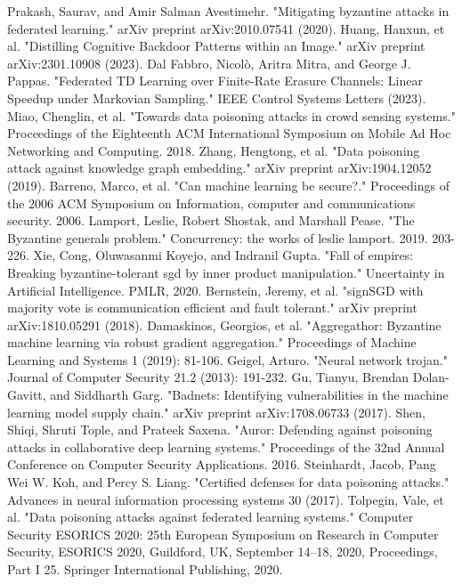 \documentclass[conference]{IEEEtran}
\begin{document}
\begin{thebibliography}{00}
     Prakash, Saurav, and Amir Salman Avestimehr. "Mitigating byzantine attacks in federated learning." arXiv preprint arXiv:2010.07541 (2020).
     Huang, Hanxun, et al. "Distilling Cognitive Backdoor Patterns within an Image." arXiv preprint arXiv:2301.10908 (2023).
     Dal Fabbro, Nicolò, Aritra Mitra, and George J. Pappas. "Federated TD Learning over Finite-Rate Erasure Channels: Linear Speedup under Markovian Sampling." IEEE Control Systems Letters (2023).
     Miao, Chenglin, et al. "Towards data poisoning attacks in crowd sensing systems." Proceedings of the Eighteenth ACM International Symposium on Mobile Ad Hoc Networking and Computing. 2018.
     Zhang, Hengtong, et al. "Data poisoning attack against knowledge graph embedding." arXiv preprint arXiv:1904.12052 (2019).
     Barreno, Marco, et al. "Can machine learning be secure?." Proceedings of the 2006 ACM Symposium on Information, computer and communications security. 2006.
     Lamport, Leslie, Robert Shostak, and Marshall Pease. "The Byzantine generals problem." Concurrency: the works of leslie lamport. 2019. 203-226.
     Xie, Cong, Oluwasanmi Koyejo, and Indranil Gupta. "Fall of empires: Breaking byzantine-tolerant sgd by inner product manipulation." Uncertainty in Artificial Intelligence. PMLR, 2020.
     Bernstein, Jeremy, et al. "signSGD with majority vote is communication efficient and fault tolerant." arXiv preprint arXiv:1810.05291 (2018).
     Damaskinos, Georgios, et al. "Aggregathor: Byzantine machine learning via robust gradient aggregation." Proceedings of Machine Learning and Systems 1 (2019): 81-106.
     Geigel, Arturo. "Neural network trojan." Journal of Computer Security 21.2 (2013): 191-232.
     Gu, Tianyu, Brendan Dolan-Gavitt, and Siddharth Garg. "Badnets: Identifying vulnerabilities in the machine learning model supply chain." arXiv preprint arXiv:1708.06733 (2017).
     Shen, Shiqi, Shruti Tople, and Prateek Saxena. "Auror: Defending against poisoning attacks in collaborative deep learning systems." Proceedings of the 32nd Annual Conference on Computer Security Applications. 2016.
     Steinhardt, Jacob, Pang Wei W. Koh, and Percy S. Liang. "Certified defenses for data poisoning attacks." Advances in neural information processing systems 30 (2017).
     Tolpegin, Vale, et al. "Data poisoning attacks against federated learning systems." Computer Security ESORICS 2020: 25th European Symposium on Research in Computer Security, ESORICS 2020, Guildford, UK, September 14–18, 2020, Proceedings, Part I 25. Springer International Publishing, 2020.

\end{thebibliography}
\end{document}
